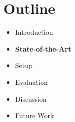 \section{Outline}
\begin{frame}{}
    \vspace{1.5cm}
    \begin{itemize}
        \setlength\itemsep{2em}
        
        \item {\color{TUMBlack} \large Introduction}
        \item \large \textbf{State-of-the-Art}
        \item \large Setup
        \item \large Evaluation
        \item \large Discussion
        \item \large Future Work
    \end{itemize}
\end{frame}